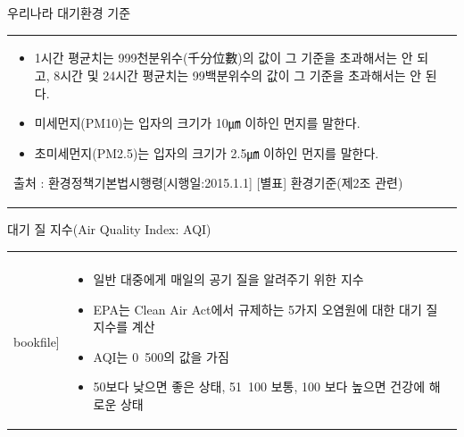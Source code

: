 \begin{frame}[t]{우리나라 대기환경 기준}
\begin{tabular}{ll}
\begin{minipage}[t]{0.4\textwidth}
			\begin{itemize}
				\item 1시간 평균치는 999천분위수(千分位數)의 값이 그 기준을 초과해서는 안 되고, 8시간 및 24시간 평균치는 99백분위수의 값이 그 기준을 초과해서는 안 된다.
				\item 미세먼지(PM10)는 입자의 크기가 10㎛ 이하인 먼지를 말한다.
				\item 초미세먼지(PM2.5)는 입자의 크기가 2.5㎛ 이하인 먼지를 말한다.
			\end{itemize}
			\scriptsize	
			출처 : 환경정책기본법시행령[시행일:2015.1.1] 
			[별표] 환경기준(제2조 관련)
		\end{minipage}
	\end{tabular}
\end{frame}



\begin{frame}[t]{대기 질 지수(Air Quality Index: AQI)}
	\begin{tabular}{ll}
		\begin{minipage}[t]{0.45\textwidth}\scriptsize
			\begin{figure}[t]
				\texttt{[image: \\bookfile]}
			\end{figure}
		\end{minipage}	
		&
		\begin{minipage}[t]{0.5\textwidth} \scriptsize	
			\begin{itemize}
				\item 일반 대중에게 매일의 공기 질을 알려주기 위한 지수
				\item EPA는 Clean Air Act에서 규제하는 5가지 오염원에 대한 대기 질 지수를 계산
				\item AQI는 0~500의 값을 가짐
				\item 50보다 낮으면 좋은 상태, 51~100 보통, 100 보다 높으면 건강에 해로운 상태
			\end{itemize}

		\end{minipage}
	\end{tabular}
\end{frame}



